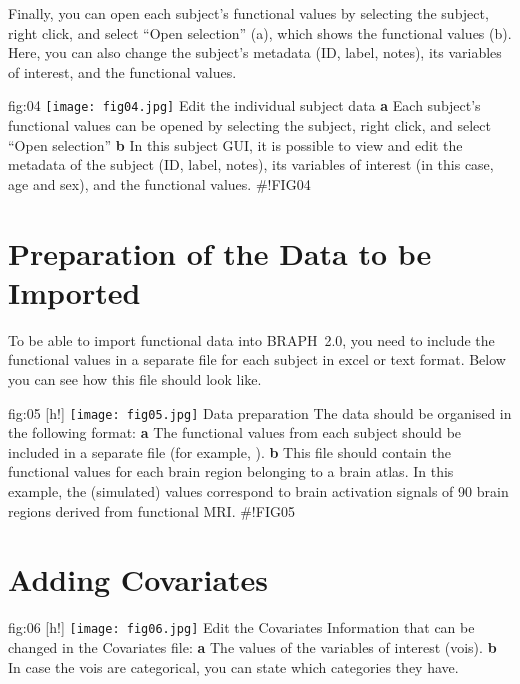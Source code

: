 \documentclass[justified]{tufte-handout}
\begin{document}
Finally, you can open each subject's functional values by selecting the subject, right click, and select ``Open selection'' (a), which shows the functional values (b). Here, you can also change the subject's metadata (ID, label, notes), its variables of interest, and the functional values.

	{fig:04}
	{\texttt{[image: fig04.jpg]}
	}
	{Edit the individual subject data}
	{
	{\bf a} Each subject's functional values can be opened by selecting the subject, right click, and select ``Open selection''
	{\bf b} In this subject GUI, it is possible to view and edit the metadata of the subject (ID, label, notes), its variables of interest (in this case, age and sex), and the functional values. 
	}
#!FIG04

\clearpage
\section{Preparation of the Data to be Imported}

To be able to import functional data into BRAPH~2.0, you need to include the functional values in a separate file for each subject in excel or text format. Below you can see how this file should look like.

	{fig:05}
	{
	[h!]
	\texttt{[image: fig05.jpg]}
	}
	{Data preparation}
	{
	The data should be organised in the following format:
	{\bf a} The functional values from each subject should be included in a separate file (for example, ). 
	{\bf b} This file should contain the functional values for each brain region belonging to a brain atlas. In this example, the (simulated) values correspond to brain activation signals of 90 brain regions derived from functional MRI.
	}
#!FIG05

\section{Adding Covariates}

	{fig:06}
	{
	[h!]
	\texttt{[image: fig06.jpg]}
	}
	{Edit the Covariates}
	{
	Information that can be changed in the Covariates file: 
	{\bf a} The values of the variables of interest (vois).
	{\bf b} In case the vois are categorical, you can state which categories they have.
	}
	
\end{document}
